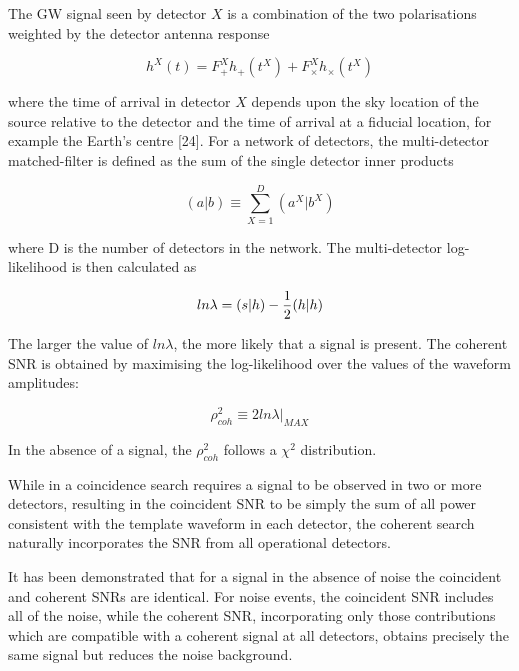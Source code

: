 \documentclass[binding=0.6cm, LaM]{sapthesis}
\begin{document}
	The GW signal seen by detector $X$ is a combination of 
	the two polarisations weighted by the detector antenna 
	response

		\begin{equation}
			h^X(t) = F_{+}^X h_{+}(t^X) + F_{\times}^X h_{\times}(t^X) 
		\end{equation}

	where the time of arrival in detector $X$ depends upon the sky location 
	of the source relative to the detector and the time of arrival at a fiducial location, 
	for example the Earth’s centre [24]. 
	For a network of detectors, the multi-detector matched-filter
	 is defined as the sum of the single detector inner products
 
		\begin{equation}
			(a|b) \equiv \sum^D_{X=1} (a^X|b^X)
		\end{equation}
	
	where D is the number of detectors in the network. The multi-detector log-likelihood is then calculated as

		\begin{equation}
			ln \lambda = (s|h) - {1 \over 2} (h|h)
		\end{equation}

	The larger the value of $ln \lambda$, the more likely that a signal is present.
	The coherent SNR is obtained by maximising the log-likelihood 
	over the values of the waveform amplitudes:

		\begin{equation}
			\rho^2 _{coh}\equiv 2 ln \lambda |_{MAX}
		\end{equation}
 	
	In the absence of a signal, the $\rho^2_{coh}$ follows a $\chi^2$ distribution.

        While in a coincidence search requires a signal to be observed in two or more detectors, 
	resulting in the coincident SNR to be simply the sum of all power consistent with the template waveform in each detector,
	the coherent search naturally incorporates the SNR from all operational detectors.
	
	It has been demonstrated that for a signal in the absence of noise the coincident and coherent SNRs are identical. 
	For noise events, the coincident SNR includes all of the noise, 
	while the coherent SNR, incorporating only those contributions which are compatible 
	with a coherent signal at all detectors, obtains precisely the same signal but reduces the noise background. 
	
\end{document}
